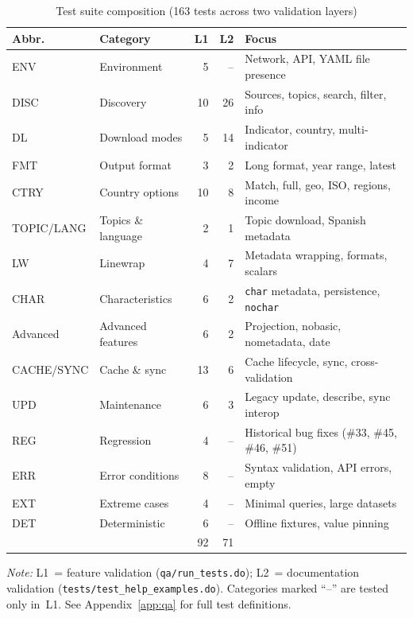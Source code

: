 \documentclass[bib]{statapress}
\newcommand{\floatnote}[2][\linewidth]{%
  \par\smallskip
  \begin{minipage}{#1}
    \small\raggedright #2
  \end{minipage}
}
\begin{document}
\begin{table}[H]
\centering
\caption{Test suite composition (163 tests across two validation layers)}
\label{tab:test-coverage}
\footnotesize
\begin{tabular}{@{}llrrl@{}}
\hline
Abbr. & Category & L1 & L2 & Focus \\
\hline
ENV        & Environment       & 5  & -- & Network, API, YAML file presence \\
DISC       & Discovery         & 10 & 26 & Sources, topics, search, filter, info \\
DL         & Download modes    & 5  & 14 & Indicator, country, multi-indicator \\
FMT        & Output format     & 3  & 2  & Long format, year range, latest \\
CTRY       & Country options   & 10 & 8  & Match, full, geo, ISO, regions, income \\
TOPIC/LANG & Topics \& language & 2  & 1  & Topic download, Spanish metadata \\
LW         & Linewrap          & 4  & 7  & Metadata wrapping, formats, scalars \\
CHAR       & Characteristics   & 6  & 2  & \texttt{char} metadata, persistence, \texttt{nochar} \\
Advanced   & Advanced features & 6  & 2  & Projection, nobasic, nometadata, date \\
CACHE/SYNC & Cache \& sync     & 13 & 6  & Cache lifecycle, sync, cross-validation \\
UPD        & Maintenance       & 6  & 3  & Legacy update, describe, sync interop \\
REG        & Regression        & 4  & -- & Historical bug fixes (\#33, \#45, \#46, \#51) \\
ERR        & Error conditions  & 8  & -- & Syntax validation, API errors, empty \\
EXT        & Extreme cases     & 4  & -- & Minimal queries, large datasets \\
DET        & Deterministic     & 6  & -- & Offline fixtures, value pinning \\
\hline
           &                   & 92 & 71 & \\
\hline
\end{tabular}

\floatnote{\emph{Note:} L1~= feature validation (\texttt{qa/run\_tests.do});
L2~= documentation validation (\texttt{tests/test\_help\_examples.do}).
Categories marked ``--'' are tested only in~L1.
See Appendix~\ref{app:qa} for full test definitions.}

\end{table}
\end{document}
